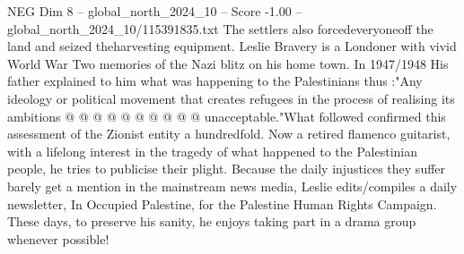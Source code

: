\begin{textsample}{NEG Dim 8 – global\_north\_2024\_10 – Score -1.00 – global\_north\_2024\_10/115391835.txt}
The settlers also forcedeveryoneoff the land and seized theharvesting equipment.
Leslie Bravery is a Londoner with vivid World War Two memories of the Nazi blitz on his home town.
In 1947/1948 His father explained to him what was happening to the Palestinians thus :"Any ideology or political movement that creates refugees in the process of realising its ambitions @ @ @ @ @ @ @ @ @ @ unacceptable."What followed confirmed this assessment of the Zionist entity a hundredfold.
Now a retired flamenco guitarist, with a lifelong interest in the tragedy of what happened to the Palestinian people, he tries to publicise their plight.
Because the daily injustices they suffer barely get a mention in the mainstream news media, Leslie edits/compiles a daily newsletter, In Occupied Palestine, for the Palestine Human Rights Campaign.
These days, to preserve his sanity, he enjoys taking part in a drama group whenever possible!

\end{textsample}
